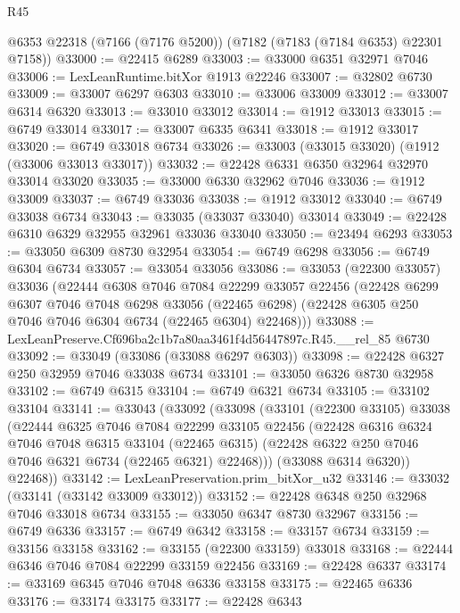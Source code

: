 \begin{lexlean}{R45}
\begin{coremodule}
{    @6353
    @22318
    (@7166 (@7176 @5200))
    (@7182 (@7183 (@7184 @6353) @22301 @7158))
@33000 := @22415 @6289
@33003 := @33000 @6351 @32971 @7046
@33006 := LexLeanRuntime.bitXor @1913 @22246
@33007 := @32802 @6730
@33009 := @33007 @6297 @6303
@33010 := @33006 @33009
@33012 := @33007 @6314 @6320
@33013 := @33010 @33012
@33014 := @1912 @33013
@33015 := @6749 @33014
@33017 := @33007 @6335 @6341
@33018 := @1912 @33017
@33020 := @6749 @33018 @6734
@33026 := @33003 (@33015 @33020) (@1912 (@33006 @33013 @33017))
@33032 := @22428 @6331 @6350 @32964 @32970 @33014 @33020
@33035 := @33000 @6330 @32962 @7046
@33036 := @1912 @33009
@33037 := @6749 @33036
@33038 := @1912 @33012
@33040 := @6749 @33038 @6734
@33043 := @33035 (@33037 @33040) @33014
@33049 := @22428 @6310 @6329 @32955 @32961 @33036 @33040
@33050 := @23494 @6293
@33053 := @33050 @6309 @8730 @32954
@33054 := @6749 @6298
@33056 := @6749 @6304 @6734
@33057 := @33054 @33056
@33086 := @33053
    (@22300 @33057)
    @33036
    (@22444
      @6308
      @7046
      @7084
      @22299
      @33057
      @22456
      (@22428
        @6299
        @6307
        @7046
        @7048
        @6298
        @33056
        (@22465 @6298)
        (@22428 @6305 @250 @7046 @7046 @6304 @6734 (@22465 @6304) @22468)))
@33088 := LexLeanPreserve.Cf696ba2c1b7a80aa3461f4d56447897c.R45.__rel_85 @6730
@33092 := @33049 (@33086 (@33088 @6297 @6303))
@33098 := @22428 @6327 @250 @32959 @7046 @33038 @6734
@33101 := @33050 @6326 @8730 @32958
@33102 := @6749 @6315
@33104 := @6749 @6321 @6734
@33105 := @33102 @33104
@33141 := @33043
    (@33092
      (@33098
        (@33101
          (@22300 @33105)
          @33038
          (@22444
            @6325
            @7046
            @7084
            @22299
            @33105
            @22456
            (@22428
              @6316
              @6324
              @7046
              @7048
              @6315
              @33104
              (@22465 @6315)
              (@22428 @6322 @250 @7046 @7046 @6321 @6734 (@22465 @6321) @22468)))
          (@33088 @6314 @6320))
        @22468))
@33142 := LexLeanPreservation.prim_bitXor_u32
@33146 := @33032 (@33141 (@33142 @33009 @33012))
@33152 := @22428 @6348 @250 @32968 @7046 @33018 @6734
@33155 := @33050 @6347 @8730 @32967
@33156 := @6749 @6336
@33157 := @6749 @6342
@33158 := @33157 @6734
@33159 := @33156 @33158
@33162 := @33155 (@22300 @33159) @33018
@33168 := @22444 @6346 @7046 @7084 @22299 @33159 @22456
@33169 := @22428 @6337
@33174 := @33169 @6345 @7046 @7048 @6336 @33158
@33175 := @22465 @6336
@33176 := @33174 @33175
@33177 := @22428 @6343
}
\end{coremodule}
\end{lexlean}
